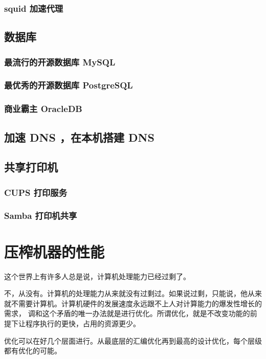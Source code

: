 \documentclass[amstex,twoside]{ctexbook}
\begin{document}
\subsection{ squid 加速代理	}
\section{  数据库	}
\subsection{  最流行的开源数据库 MySQL}
\subsection{  最优秀的开源数据库 PostgreSQL 	}
\subsection{  商业霸主 OracleDB	}
\section{  加速 DNS ，在本机搭建 DNS	}
\section{  共享打印机	}
\subsection{ CUPS 打印服务	}
\subsection{ Samba 打印机共享	}


\chapter{压榨机器的性能}

这个世界上有许多人总是说，计算机处理能力已经过剩了。

不，从没有。计算机的处理能力从来就没有过剩过。如果说过剩，只能说，他从来就不需要计算机。计算机硬件的发展速度永远跟不上人对计算能力的爆发性增长的需求，
调和这个矛盾的唯一办法就是进行优化。所谓优化，就是不改变功能的前提下让程序执行的更快，占用的资源更少。

优化可以在好几个层面进行。从最底层的汇编优化再到最高的设计优化，每个层级都有优化的可能。
\end{document}
